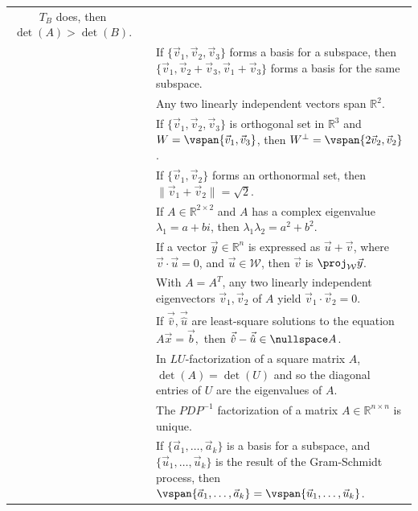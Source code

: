 \begin{table}[!h]
\begin{tabular}{c@{\hspace{2.5em}}cp{}}
						      \(T_B\) does, then \(\det(A) > \det(B)\). \\[0.75em]
			\dbubble & \bubble & If \(\{\vec{v}_1, \vec{v}_2, \vec{v}_3\}\) forms a basis for a subspace, then 
						      \(\{\vec{v}_1, \vec{v}_2 + \vec{v}_3, \vec{v}_1 + \vec{v}_3\}\) forms a basis for the same subspace.\\[0.75em]
			\bubble & \dbubble & Any two linearly independent vectors span \(\mathbb{R}^2.\) \\[0.75em]
			\dbubble & \bubble & If \(\{\vec{v}_1, \vec{v}_2, \vec{v}_3\}\) is orthogonal set in \(\mathbb{R}^3\) and 
						     \(W = \vspan\{\vec{v}_1, \vec{v}_3\}\), then \(W^\perp = \vspan\{2\vec{v}_2, \vec{v}_2\}\). \\[0.75em]
			\dbubble & \bubble & If \(\{\vec{v}_1, \vec{v}_2\}\) forms an orthonormal set, then \(\|\vec{v}_1 + \vec{v}_2\| = \sqrt{2}\). \\[0.75em]
			\dbubble & \bubble & If \(A \in \mathbb{R}^{2 \times 2}\) and \(A\) has a complex eigenvalue \(\lambda_1 = a + bi\), 
						      then \(\lambda_1\lambda_2 = a^2 + b^2\). \\[0.75em]
			\bubble & \dbubble & If a vector \(\vec{y} \in \mathbb{R}^n\) is expressed as \(\vec{u} + \vec{v}\), where \(\vec{v} \cdot \vec{u} = 0\), 
						      and \(\vec{u} \in \mathcal{W}\), then \(\vec{v}\) is \(\proj_\mathcal{W} \vec{y}\). \\[0.75em]
			\bubble & \dbubble & With \(A = A^T\), any two linearly independent eigenvectors \(\vec{v}_1, \vec{v}_2\) of \(A\) yield 
						     \(\vec{v}_1 \cdot \vec{v}_2 = 0\).\\[0.75em]
			\dbubble & \bubble & If \(\vec{\hat{v}}, \vec{\hat{u}}\) are least-square solutions to the equation \(A\vec{x} = \vec{b},\) then 
						      \(\vec{\hat{v}} - \vec{\hat{u}} \in \nullspace A\).\\[0.75em]
			\bubble & \dbubble & In \(LU\)-factorization of a square matrix \(A\), \(\det(A) = \det(U)\) and so the diagonal entries of \(U\) are the 
						      eigenvalues of \(A\). \\[0.75em]
			\bubble & \dbubble & The \(PDP^{-1}\) factorization of a matrix \(A \in \mathbb{R}^{n \times n}\) is unique. \\[0.75em]
			\dbubble & \bubble & If \(\{\vec{a}_1, \dots, \vec{a}_k\}\) is a basis for a subspace, and 
						      \(\{\vec{u}_1, \dots, \vec{u}_k\}\) is the result of the Gram-Schmidt process, then 
						     \(\vspan \{\vec{a}_1, \dots, \vec{a}_k\} = \vspan\{\vec{u}_1, \dots, \vec{u}_k\}\). \\[0.75em]
			\bottomrule
		\end{tabular}
	\end{table}


